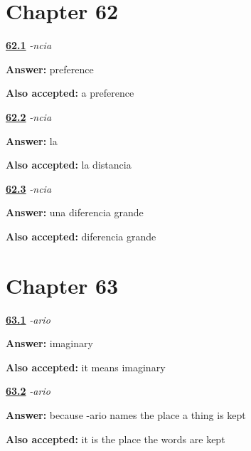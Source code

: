 \section*{Chapter 62}

\noindent\begin{minipage}[t]{\linewidth}
\raggedright
\hyperlink{review-ES-C09-ncia-decode}{\textbf{62.1}} \emph{-ncia}\par
\small \textbf{Answer:} preference\par
\footnotesize \textbf{Also accepted:} a preference
\end{minipage}\par\medskip

\noindent\begin{minipage}[t]{\linewidth}
\raggedright
\hyperlink{review-ES-C09-ncia-article}{\textbf{62.2}} \emph{-ncia}\par
\small \textbf{Answer:} la\par
\footnotesize \textbf{Also accepted:} la distancia
\end{minipage}\par\medskip

\noindent\begin{minipage}[t]{\linewidth}
\raggedright
\hyperlink{review-ES-C09-ncia-build}{\textbf{62.3}} \emph{-ncia}\par
\small \textbf{Answer:} una diferencia grande\par
\footnotesize \textbf{Also accepted:} diferencia grande
\end{minipage}\par\medskip

\section*{Chapter 63}

\noindent\begin{minipage}[t]{\linewidth}
\raggedright
\hyperlink{review-ES-C09-ario-decode}{\textbf{63.1}} \emph{-ario}\par
\small \textbf{Answer:} imaginary\par
\footnotesize \textbf{Also accepted:} it means imaginary
\end{minipage}\par\medskip

\noindent\begin{minipage}[t]{\linewidth}
\raggedright
\hyperlink{review-ES-C09-ario-place}{\textbf{63.2}} \emph{-ario}\par
\small \textbf{Answer:} because -ario names the place a thing is kept\par
\footnotesize \textbf{Also accepted:} it is the place the words are kept
\end{minipage}\par\medskip

